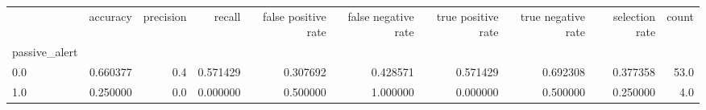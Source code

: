 \begin{tabular}{lrrrrrrrrr}
\toprule
{} &  accuracy &  precision &    recall &  false positive rate &  false negative rate &  true positive rate &  true negative rate &  selection rate &  count \\
passive\_alert &           &            &           &                      &                      &                     &                     &                 &        \\
\midrule
0.0           &  0.660377 &        0.4 &  0.571429 &             0.307692 &             0.428571 &            0.571429 &            0.692308 &        0.377358 &   53.0 \\
1.0           &  0.250000 &        0.0 &  0.000000 &             0.500000 &             1.000000 &            0.000000 &            0.500000 &        0.250000 &    4.0 \\
\bottomrule
\end{tabular}
